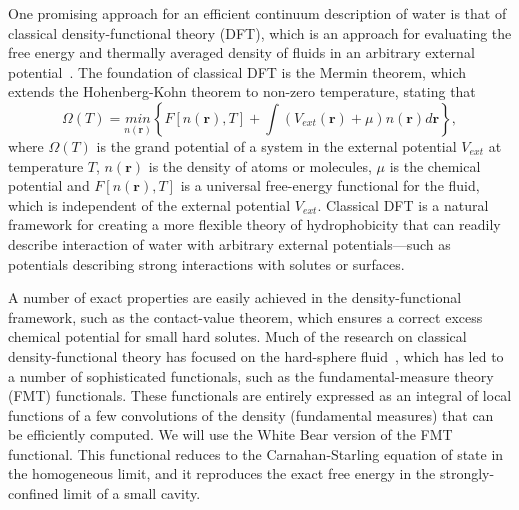 \documentclass[twocolumn,amsmath,amssymb,prl]{revtex4-1}
\newcommand{\rr}{\textbf{r}}
\begin{document}
One promising approach for an efficient continuum description of water
is that of classical density-functional theory (DFT), which is an
approach for evaluating the free energy and thermally averaged density
of fluids in an arbitrary external potential~\cite{ebner1976density}.
The foundation of classical DFT is the Mermin
theorem\cite{mermin1965thermal}, which extends the Hohenberg-Kohn
theorem\cite{hohenberg1964inhomogeneous} to non-zero temperature,
stating that
\begin{equation}
  \Omega (T) = \underset{n(\rr)}{min}\left\{ F[n(\rr),T] + \int (V_\textit{ext}(\rr) +\mu)n(\rr)
d\rr\right\},
\end{equation}
where $\Omega (T)$ is the grand potential of a system in the external
potential $V_\textit{ext}$ at temperature $T$, $n(\rr)$ is the density
of atoms or molecules, $\mu$ is the chemical potential and
$F[n(\rr),T]$ is a universal free-energy functional for the fluid,
which is independent of the external potential $V_\textit{ext}$.
Classical DFT is a natural framework for creating a more flexible
theory of hydrophobicity that can readily describe interaction of
water with arbitrary external potentials---such as potentials
describing strong interactions with solutes or surfaces.

A number of exact properties are easily achieved in the
density-functional framework, such as the contact-value theorem, which
ensures a correct excess chemical potential for small hard solutes.
Much of the research on classical density-functional theory has
focused on the hard-sphere fluid~\cite{curtin1985, rosenfeld1989,
  rosenfeld1993, rosenfeld1997, tarazona1997, tarazona2000}, which has
led to a number of sophisticated functionals, such as the
fundamental-measure theory (FMT) functionals\cite{rosenfeld1989,
  rosenfeld1993, rosenfeld1997, tarazona1997, tarazona2000,
  roth2002whitebear, yu2002structures}.  These functionals are
entirely expressed as an integral of local functions of a few
convolutions of the density (fundamental measures) that can be
efficiently computed.  We will use the White Bear version of the FMT
functional\cite{roth2002whitebear, yu2002structures}.  This functional
reduces to the Carnahan-Starling equation of state in the homogeneous
limit, and it reproduces the exact free energy in the
strongly-confined limit of a small cavity.
\end{document}
